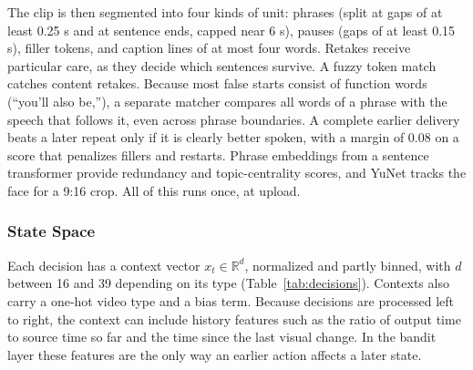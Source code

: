 \documentclass{ieeeaccess}
\begin{document}
The clip is then segmented into four kinds of unit: phrases (split at gaps of at least 0.25 s and at sentence ends, capped near 6 s), pauses (gaps of at least 0.15 s), filler tokens, and caption lines of at most four words. Retakes receive particular care, as they decide which sentences survive. A fuzzy token match catches content retakes. Because most false starts consist of function words (``you'll also be,''), a separate matcher compares all words of a phrase with the speech that follows it, even across phrase boundaries. A complete earlier delivery beats a later repeat only if it is clearly better spoken, with a margin of 0.08 on a score that penalizes fillers and restarts. Phrase embeddings from a sentence transformer \cite{reimers2019} provide redundancy and topic-centrality scores, and YuNet \cite{wu2023yunet} tracks the face for a 9:16 crop. All of this runs once, at upload.

\subsubsection{State Space}
Each decision has a context vector $x_t \in \mathbb{R}^{d}$, normalized and partly binned, with $d$ between 16 and 39 depending on its type (Table~\ref{tab:decisions}). Contexts also carry a one-hot video type and a bias term. Because decisions are processed left to right, the context can include history features such as the ratio of output time to source time so far and the time since the last visual change. In the bandit layer these features are the only way an earlier action affects a later state.
\end{document}
